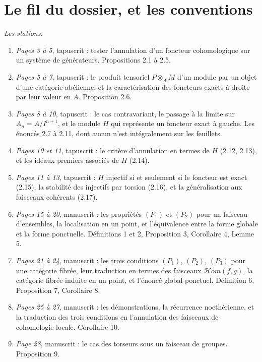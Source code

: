 \documentclass[11pt,a4paper]{article}
\begin{document}
\section*{Le fil du dossier, et les conventions}

\emph{Les stations.}

\begin{enumerate}
  \item \emph{Pages 3 à 5}, tapuscrit : tester l'annulation d'un foncteur
  cohomologique sur un système de générateurs. Propositions 2.1 à 2.5.
  \item \emph{Pages 5 à 7}, tapuscrit : le produit tensoriel $P \otimes_A M$
  d'un module par un objet d'une catégorie abélienne, et la caractérisation des
  foncteurs exacts à droite par leur valeur en $A$. Proposition 2.6.
  \item \emph{Pages 8 à 10}, tapuscrit : le cas contravariant, le passage à la
  limite sur $A_n = A/I^{n+1}$, et le module $H$ qui représente un foncteur
  exact à gauche. Les énoncés 2.7 à 2.11, dont aucun n'est intégralement sur
  les feuillets.
  \item \emph{Pages 10 et 11}, tapuscrit : le critère d'annulation en termes de
  $H$ (2.12, 2.13), et les idéaux premiers associés de $H$ (2.14).
  \item \emph{Pages 11 à 13}, tapuscrit : $H$ injectif si et seulement si le
  foncteur est exact (2.15), la stabilité des injectifs par torsion (2.16), et
  la généralisation aux faisceaux cohérents (2.17).
  \item \emph{Pages 15 à 20}, manuscrit : les propriétés $(P_1)$ et $(P_2)$
  pour un faisceau d'ensembles, la localisation en un point, et l'équivalence
  entre la forme globale et la forme ponctuelle. Définitions 1 et 2,
  Proposition 3, Corollaire 4, Lemme 5.
  \item \emph{Pages 21 à 24}, manuscrit : les trois conditions $(P_1)$,
  $(P_2)$, $(P_3)$ pour une catégorie fibrée, leur traduction en termes des
  faisceaux $\mathcal{H}om(f,g)$, la catégorie fibrée induite en un point, et
  l'énoncé global-ponctuel. Définition 6, Proposition 7, Corollaire 8.
  \item \emph{Pages 25 à 27}, manuscrit : les démonstrations, la récurrence
  noethérienne, et la traduction des trois conditions en l'annulation des
  faisceaux de cohomologie locale. Corollaire 10.
  \item \emph{Page 28}, manuscrit : le cas des torseurs sous un faisceau de
  groupes. Proposition 9.
\end{enumerate}
\end{document}
